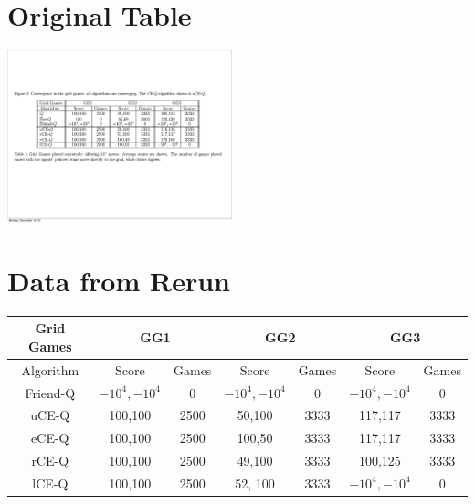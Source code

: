 \section{Original Table}
\includegraphics[height=50mm]{text/pic_CEQ.pdf}


\section{Data from Rerun}
\begin{tabular}{||c||c|c||c|c||c|c||}
	\hline
	Grid Games&  \multicolumn{2}{|c||}{GG1} &
	 \multicolumn{2}{|c||}{GG2}  & \multicolumn{2}{|c||}{GG3}  \\ \hline
	Algorithm & Score & Games & Score & Games & Score & Games \\ \hline \hline
	Friend-Q & $-10^{4},-10^{4}$ & 0 & $-10^{4},-10^{4}$ & 0 & $-10^{4},-10^{4}$ & 0 \\ \hline \hline
	uCE-Q & 100,100 & 2500 & 50,100 & 3333 & 117,117 & 3333 \\ \hline
	eCE-Q & 100,100 & 2500 & 100,50 & 3333 & 117,117 & 3333 \\ \hline
	rCE-Q & 100,100 & 2500 & 49,100 & 3333 & 100,125 & 3333 \\ \hline \hline
	lCE-Q & 100,100 & 2500 & 52, 100 & 3333 & $-10^{4},-10^{4}$ & 0 \\ \hline 
	
\end{tabular}


